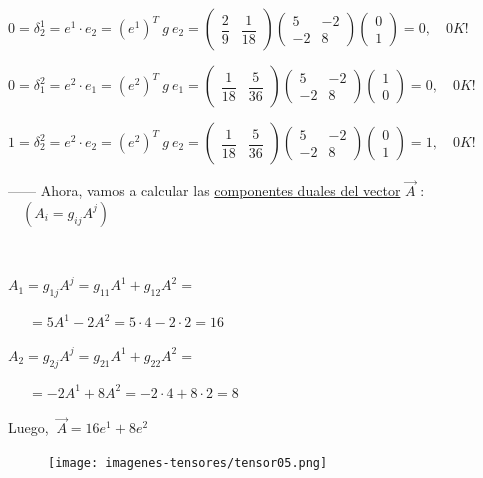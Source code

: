$0=\delta^1_2=e^1\cdot e_2=(e^1)^T\ g \ e_2 = 
\left( \begin{matrix} \dfrac 2 9 & \dfrac 1 {18} \end{matrix} \right)
\left( \begin{matrix} 5&-2\\-2&8 \end{matrix} \right)
\left( \begin{matrix} 0 \\ 1 \end{matrix} \right) = 0,\quad 0K!$

$0=\delta^2_1=e^2\cdot e_1=(e^2)^T\ g \ e_1 = 
\left( \begin{matrix} \dfrac 1 {18} & \dfrac 5 {36} \end{matrix} \right)
\left( \begin{matrix} 5&-2\\-2&8 \end{matrix} \right)
\left( \begin{matrix} 1 \\ 0 \end{matrix} \right) = 0,\quad 0K!$

$1=\delta^2_2=e^2\cdot e_2=(e^2)^T\ g \ e_2 = 
\left( \begin{matrix} \dfrac 1 {18} & \dfrac 5 {36} \end{matrix} \right)
\left( \begin{matrix} 5&-2\\-2&8 \end{matrix} \right)
\left( \begin{matrix} 0 \\ 1 \end{matrix} \right) = 1,\quad 0K!$

------ Ahora, vamos a calcular las \underline{componentes duales del vector}  $\overrightarrow A$ :\textcolor{gris}{$\quad (A_i=g_{ij}A^j)$}

\begin{multicols}{2}
$\quad$
	
$A_1=g_{1j}A^j=g_{11}A^1+g_{12}A^2=$

$\quad \ \ =5A^1-2A^2=5\cdot 4-2\cdot 2=16$

$A_2=g_{2j}A^j=g_{21}A^1+g_{22}A^2=$

$\quad \ \ =-2A^1+8A^2=-2\cdot 4+8\cdot 2=8$

Luego, $\ \overrightarrow A=16e^1+8e^2$

\begin{figure}[H]
		\centering
		\texttt{[image: imagenes-tensores/tensor05.png]}
	\end{figure}
	
\end{multicols}
	
